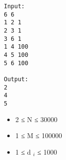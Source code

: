 \begin{verbatim}
Input:
6 6
1 2 1
2 3 1
3 6 1
1 4 100
4 5 100
5 6 100

Output:
2
4 
5

\end{verbatim}
\begin{itemize}
	\item     2 ≤ N ≤ 30000   
	\item     1 ≤ M ≤ 100000   
	\item     1 ≤ d    $_     i    $    ≤ 1000   
\end{itemize}
